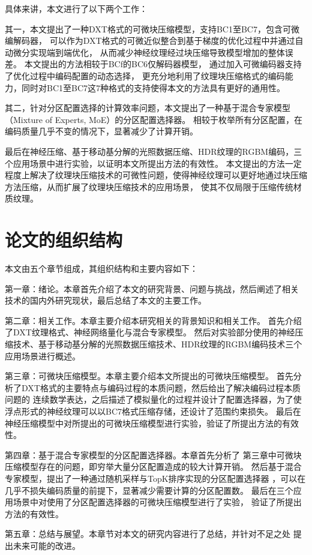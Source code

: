 具体来讲，本文进行了以下两个工作：

其一，本文提出了一种DXT格式的可微块压缩模型，支持BC1至BC7，包含可微编解码器，
可以作为DXT格式的可微近似整合到基于梯度的优化过程中并通过自动微分实现端到端优化，
从而减少神经纹理经过块压缩导致模型增加的整体误差。
本文提出的方法相较于BCf\cite{weinreich2024real}的BC6仅解码器模型，
通过加入可微编码器支持了优化过程中编码配置的动态选择，
更充分地利用了纹理块压缩格式的编码能力，同时对BC1至BC7这7种格式的支持使得本文的方法具有更好的通用性。

其二，针对分区配置选择的计算效率问题，本文提出了一种基于混合专家模型（Mixture of Experts, MoE）的分区配置选择器。
相较于枚举所有分区配置，在编码质量几乎不变的情况下，显著减少了计算开销。

最后在神经压缩\cite{weinreich2024real}、基于移动基分解的光照数据压缩\cite{silvennoinen2021moving}、HDR纹理的RGBM编码，三个应用场景中进行实验，以证明本文所提出方法的有效性。
本文提出的方法一定程度上解决了纹理块压缩技术的可微性问题，使得神经纹理可以更好地通过块压缩方法压缩，从而扩展了纹理块压缩技术的应用场景，
使其不仅局限于压缩传统材质纹理。

\section{论文的组织结构}

本文由五个章节组成，其组织结构和主要内容如下：

第一章：绪论。本章首先介绍了本文的研究背景、问题与挑战，然后阐述了相关
技术的国内外研究现状，最后总结了本文的主要工作。

第二章：相关工作。本章主要介绍本研究相关的背景知识和相关工作。
首先介绍了DXT纹理格式、神经网络量化与混合专家模型。
然后对实验部分使用的神经压缩技术、基于移动基分解的光照数据压缩技术、HDR纹理的RGBM编码技术三个应用场景进行概述。

第三章：可微块压缩模型。本章主要介绍本文所提出的可微块压缩模型。
首先分析了DXT格式的主要特点与编码过程的本质问题，然后给出了解决编码过程本质问题的
连续数学表达，之后描述了模拟量化的过程并设计了配置选择器，为了使
浮点形式的神经纹理可以以BC7格式压缩存储，还设计了范围约束损失。
最后在神经压缩模型中对所提出的可微块压缩模型进行实验，验证了所提出方法的有效性。

第四章：基于混合专家模型的分区配置选择器。本章首先分析了
第三章中可微块压缩模型存在的问题，即穷举大量分区配置造成的较大计算开销。
然后基于混合专家模型，提出了一种通过随机采样与TopK排序实现的分区配置选择器
，可以在几乎不损失编码质量的前提下，显著减少需要计算的分区配置数。
最后在三个应用场景中对使用了分区配置选择器的可微块压缩模型进行了实验，
验证了所提出方法的有效性。

第五章：总结与展望。本章节对本文的研究内容进行了总结，并针对不足之处
提出未来可能的改进。

